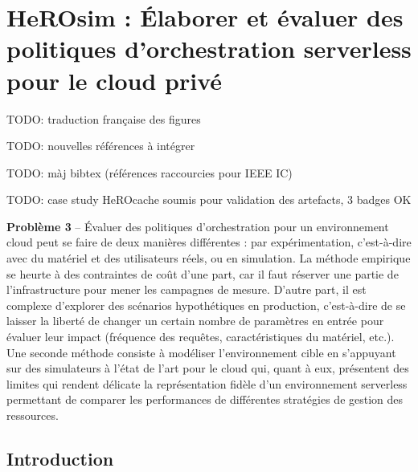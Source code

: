 \chapter{HeROsim : Élaborer et évaluer des politiques d'orchestration serverless pour le cloud privé}
\label{chapter:herosim}

TODO: traduction française des figures

TODO: nouvelles références à intégrer~\cite{bambrikSurveyCloudComputing2020, byrneReviewCloudComputing2017}

TODO: màj bibtex (références raccourcies pour IEEE IC)

TODO: case study HeROcache soumis pour validation des artefacts, 3 badges OK

\textbf{Problème 3} -- Évaluer des politiques d'orchestration pour un environnement cloud peut se faire de deux manières différentes : par expérimentation, c'est-à-dire avec du matériel et des utilisateurs réels, ou en simulation. La méthode empirique se heurte à des contraintes de coût d'une part, car il faut réserver une partie de l'infrastructure pour mener les campagnes de mesure. D'autre part, il est complexe d'explorer des scénarios hypothétiques en production, c'est-à-dire de se laisser la liberté de changer un certain nombre de paramètres en entrée pour évaluer leur impact (fréquence des requêtes, caractéristiques du matériel, etc.). Une seconde méthode consiste à modéliser l'environnement cible en s'appuyant sur des simulateurs à l'état de l'art pour le cloud qui, quant à eux, présentent des limites qui rendent délicate la représentation fidèle d'un environnement serverless permettant de comparer les performances de différentes stratégies de gestion des ressources.


\section{Introduction}
\label{section:herosim-introduction}



